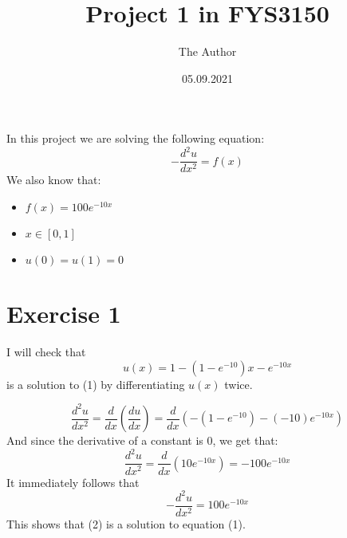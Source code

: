 \documentclass[11pt]{article} %
\title{Project 1 in FYS3150 }
\author{The Author}
\date{05.09.2021} %
\begin{document}
\maketitle
In this project we are solving the following equation:
\begin{equation} - \dfrac{d^2u}{dx^2} = f(x) \end{equation}
We also know that:
\begin{itemize}
	\item \(f(x) = 100e^{-10x}\)
	\item \(x \in [0, 1]\)
	\item \(u(0)=u(1)=0\)
\end{itemize}

\section*{Exercise 1}


I will check that 
\begin{equation}  u(x) = 1 - (1- e^{-10})x -e^{-10x} \end{equation}
is a solution to (1) by differentiating \(u(x)\) twice. 

\[\dfrac{d^2u}{dx^2} =\dfrac{d}{dx}(\dfrac{du}{dx}) = \dfrac{d}{dx}( -(1 - e^{-10}) - (-10)e^{-10x})\]
And since the derivative of a constant is 0, we get that: 
\[\dfrac{d^2u}{dx^2} = \dfrac{d}{dx}(10e^{-10x}) = -100e^{-10x}\]
It immediately follows that
\[ - \dfrac{d^2u}{dx^2} = 100e^{-10x}\]
This shows that (2) is a solution to equation (1).
\end{document}
